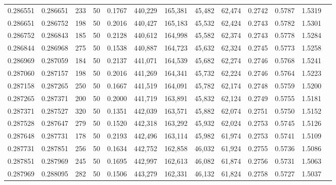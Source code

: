 \begin{tabular}{rrrrrrrrrrrrr}
0.286551 & 0.286651 &   233 &  50 &                                     0.1767 & 440,229 & 165,381 &  45,482 &  62,474 & 0.2742 & 0.5787 & 1.5319 \\
0.286651 & 0.286752 &   198 &  50 &                                     0.2016 & 440,427 & 165,183 &  45,532 &  62,424 & 0.2743 & 0.5782 & 1.5301 \\
0.286752 & 0.286843 &   185 &  50 &                                     0.2128 & 440,612 & 164,998 &  45,582 &  62,374 & 0.2743 & 0.5778 & 1.5284 \\
0.286844 & 0.286968 &   275 &  50 &                                     0.1538 & 440,887 & 164,723 &  45,632 &  62,324 & 0.2745 & 0.5773 & 1.5258 \\
0.286969 & 0.287059 &   184 &  50 &                                     0.2137 & 441,071 & 164,539 &  45,682 &  62,274 & 0.2746 & 0.5768 & 1.5241 \\
0.287060 & 0.287157 &   198 &  50 &                                     0.2016 & 441,269 & 164,341 &  45,732 &  62,224 & 0.2746 & 0.5764 & 1.5223 \\
0.287158 & 0.287265 &   250 &  50 &                                     0.1667 & 441,519 & 164,091 &  45,782 &  62,174 & 0.2748 & 0.5759 & 1.5200 \\
0.287265 & 0.287371 &   200 &  50 &                                     0.2000 & 441,719 & 163,891 &  45,832 &  62,124 & 0.2749 & 0.5755 & 1.5181 \\
0.287371 & 0.287527 &   320 &  50 &                                     0.1351 & 442,039 & 163,571 &  45,882 &  62,074 & 0.2751 & 0.5750 & 1.5152 \\
0.287528 & 0.287647 &   279 &  50 &                                     0.1520 & 442,318 & 163,292 &  45,932 &  62,024 & 0.2753 & 0.5745 & 1.5126 \\
0.287648 & 0.287731 &   178 &  50 &                                     0.2193 & 442,496 & 163,114 &  45,982 &  61,974 & 0.2753 & 0.5741 & 1.5109 \\
0.287731 & 0.287851 &   256 &  50 &                                     0.1634 & 442,752 & 162,858 &  46,032 &  61,924 & 0.2755 & 0.5736 & 1.5086 \\
0.287851 & 0.287969 &   245 &  50 &                                     0.1695 & 442,997 & 162,613 &  46,082 &  61,874 & 0.2756 & 0.5731 & 1.5063 \\
0.287969 & 0.288095 &   282 &  50 &                                     0.1506 & 443,279 & 162,331 &  46,132 &  61,824 & 0.2758 & 0.5727 & 1.5037 \\

\end{tabular}
